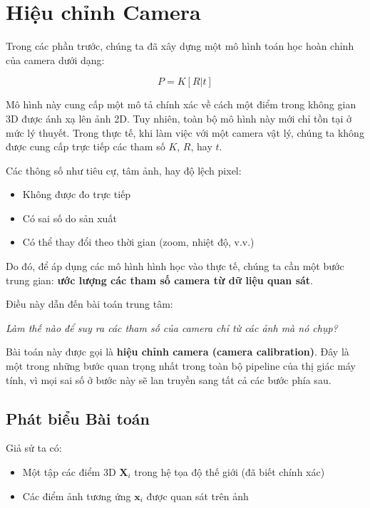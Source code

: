 \section{Hiệu chỉnh Camera}
\label{sec:camera_calibration}

Trong các phần trước, chúng ta đã xây dựng một mô hình toán học hoàn chỉnh của camera dưới dạng:

\[
P = K[R|t]
\]

Mô hình này cung cấp một mô tả chính xác về cách một điểm trong không gian 3D được ánh xạ lên ảnh 2D. Tuy nhiên, toàn bộ mô hình này mới chỉ tồn tại ở mức lý thuyết. Trong thực tế, khi làm việc với một camera vật lý, chúng ta không được cung cấp trực tiếp các tham số $K$, $R$, hay $t$.

Các thông số như tiêu cự, tâm ảnh, hay độ lệch pixel:
\begin{itemize}
	\item Không được đo trực tiếp
	\item Có sai số do sản xuất
	\item Có thể thay đổi theo thời gian (zoom, nhiệt độ, v.v.)
\end{itemize}

Do đó, để áp dụng các mô hình hình học vào thực tế, chúng ta cần một bước trung gian: \textbf{ước lượng các tham số camera từ dữ liệu quan sát}.

Điều này dẫn đến bài toán trung tâm:

\begin{center}
	\textit{Làm thế nào để suy ra các tham số của camera chỉ từ các ảnh mà nó chụp?}
\end{center}

Bài toán này được gọi là \textbf{hiệu chỉnh camera (camera calibration)}. Đây là một trong những bước quan trọng nhất trong toàn bộ pipeline của thị giác máy tính, vì mọi sai số ở bước này sẽ lan truyền sang tất cả các bước phía sau.

\subsection{Phát biểu Bài toán}
\label{subsec:calibration_problem}

Giả sử ta có:
\begin{itemize}
	\item Một tập các điểm 3D $\mathbf{X}_i$ trong hệ tọa độ thế giới (đã biết chính xác)
	\item Các điểm ảnh tương ứng $\mathbf{x}_i$ được quan sát trên ảnh
\end{itemize}

